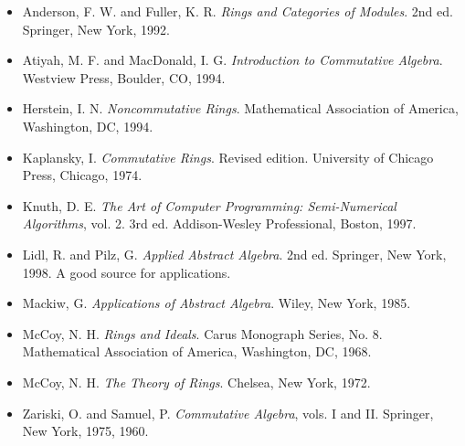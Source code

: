 {\small
\begin{itemize}
 
\item[{\bf [1]}] %
Anderson, F. W. and Fuller, K. R. {\it Rings and Categories of
Modules}. 2nd ed.  Springer, New York, 1992.
 
\item[{\bf [2]}] %
Atiyah, M. F.  and MacDonald, I. G. {\it Introduction to
Commutative Algebra}. Westview Press, Boulder, CO, 1994.
 
\item[{\bf [3]}] %
Herstein, I. N. {\it Noncommutative Rings}. Mathematical Association of America,
Washington, DC, 1994.
 
 
\item[{\bf [4]}] %
Kaplansky, I. {\it Commutative Rings}. Revised edition.
University of Chicago Press, Chicago, 1974.
 
 
\item[{\bf [5]}] %
Knuth, D. E. {\it The Art of Computer Programming: Semi-Numerical
Algorithms}, vol. 2. 3rd ed. Addison-Wesley Professional, Boston, 1997. 
 
 
\item[{\bf [6]}] %
Lidl, R. and Pilz, G. 
{\it Applied Abstract Algebra}. 2nd ed. Springer,
New York, 1998. A good source for applications.
 
\item[{\bf [7]}] %
Mackiw, G. {\it Applications of Abstract Algebra}. Wiley,
New York, 1985.
 
 
\item[{\bf [8]}] %
McCoy,  N. H. {\it  Rings and Ideals}. Carus Monograph Series, No. 8.
Mathematical Association of America, Washington, DC, 1968. 
 
\item[{\bf [9]}] %
McCoy,  N. H. {\it  The Theory of Rings}. Chelsea, New York, 1972.
 
\item[{\bf [10]}] %
Zariski, O. and Samuel, P. {\it Commutative Algebra}, vols. I
and II. Springer, New York, 1975, 1960.
 
 
 
\end{itemize}
}
 
\sagesection
 
 
